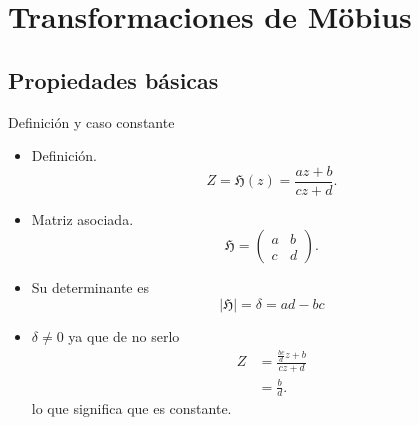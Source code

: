 \documentclass{beamer}
\begin{document}
\section{Transformaciones de Möbius}
\subsection{Propiedades básicas}

\begin{frame}{Definición y caso constante}
    \begin{itemize}
        \item Definición.
        \begin{equation}
            Z=\mathfrak{H}(z)=\frac{az+b}{cz+d}.
            \label{eq:(22)}
        \end{equation}
        \item Matriz asociada.
        \begin{equation*}
            \mathfrak{H}=
            \begin{pmatrix}
                a & b\\
                c & d
            \end{pmatrix}.
        \end{equation*}
        \item Su determinante es
        \begin{equation*}
            |\mathfrak{H}|=\delta=ad-bc
        \end{equation*}
        \item $\delta \neq 0$ ya que de no serlo
        \begin{align*}
            Z&=\frac{\frac{bc}{d}z+b}{cz+d}\\
            &=\frac{b}{d}.
        \end{align*}
        lo que significa que es constante.
    \end{itemize}
\end{frame}
\end{document}
